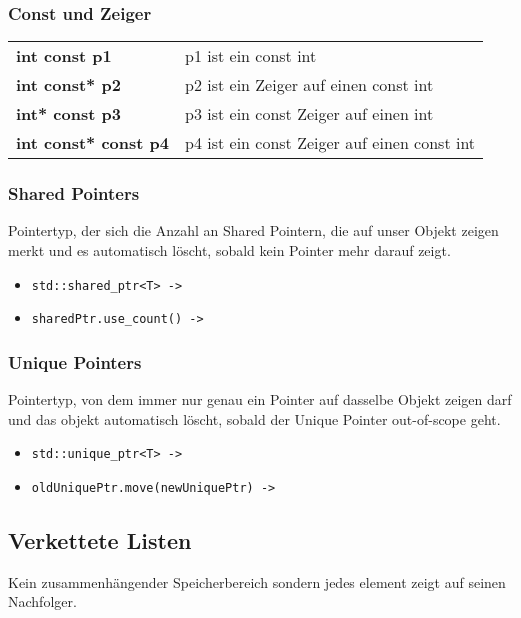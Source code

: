 \documentclass[a3paper, 10pt, landscape]{scrartcl}
\newcommand{\code}[1]{\texttt{#1}}
\begin{document}
\begin{multicols*}{3}
	\subsubsection{Const und Zeiger}
	\begin{tabular}{l l}
		\textbf{int const p1} & p1 ist ein const int \\
		\textbf{int const* p2} & p2 ist ein Zeiger auf einen const int \\
		\textbf{int* const p3} & p3 ist ein const Zeiger auf einen int \\
		\textbf{int const* const p4} & p4 ist ein const Zeiger auf einen const int 
	\end{tabular}

        \subsubsection{Shared Pointers}
        Pointertyp, der sich die Anzahl an Shared Pointern, die auf unser Objekt zeigen merkt und es automatisch löscht, sobald kein Pointer mehr darauf zeigt.
        \begin{itemize}
            \item \code{std::shared\_ptr<T> -> }  
            \item \code{sharedPtr.use\_count() -> } 
        \end{itemize}

        \subsubsection{Unique Pointers}
        Pointertyp, von dem immer nur genau ein Pointer auf dasselbe Objekt zeigen darf und das objekt automatisch löscht, sobald der Unique Pointer out-of-scope geht.
        \begin{itemize}
            \item \code{std::unique\_ptr<T> -> }  
            \item \code{oldUniquePtr.move(newUniquePtr) -> } 
        \end{itemize}
	
	\subsection{Verkettete Listen}
	Kein zusammenhängender Speicherbereich sondern jedes element zeigt auf seinen Nachfolger.

\end{multicols*}
\end{document}
